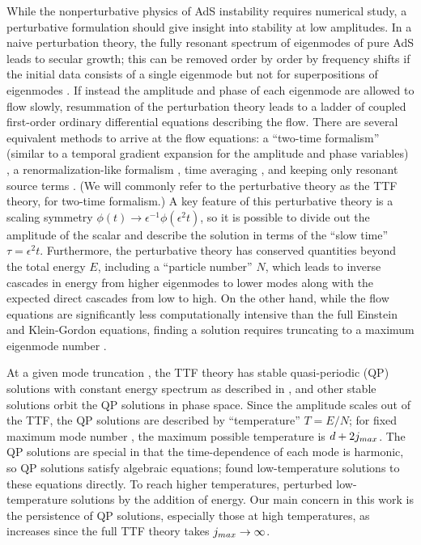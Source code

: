 \documentclass[../PhD.tex]{subfiles}
\begin{document}
While the nonperturbative physics of AdS instability requires numerical study, a perturbative formulation should give insight into stability at low amplitudes.  In a naive perturbation theory, the fully resonant spectrum of eigenmodes of pure AdS leads to secular growth; this can be removed order by order by frequency shifts if the initial data consists of a single eigenmode but not for superpositions of eigenmodes \cite{1109.1825}.  If instead the amplitude and phase of each eigenmode are allowed to flow slowly, resummation of the perturbation theory leads to a ladder of coupled first-order ordinary differential equations describing the flow.  There are several equivalent methods to arrive at the flow equations: a ``two-time formalism'' (similar to a temporal gradient expansion for the amplitude and phase variables) \cite{1403.6471}, a renormalization-like formalism \cite{1407.6273,1412.3249}, time averaging \cite{1412.3249,1510.07836}, and keeping only resonant source terms \cite{1506.03519}.  (We will commonly refer to the perturbative theory as the TTF theory, for two-time formalism.)  A key feature of this perturbative theory is a scaling symmetry $\phi(t)\to \epsilon^{-1}\phi(\epsilon^2 t)$, so it is possible to divide out the amplitude of the scalar and describe the solution in terms of the ``slow time'' $\tau=\epsilon^2 t$.  Furthermore, the perturbative theory has conserved quantities beyond the total energy $E$, including a ``particle number'' $N$, which leads to inverse cascades in energy from higher eigenmodes to lower modes along with the expected direct cascades from low to high.  On the other hand, while the flow equations are significantly less computationally intensive than the full Einstein and Klein-Gordon equations, finding a solution requires truncating to a maximum eigenmode number \jm.

At a given mode truncation \jm, the TTF theory has stable quasi-periodic (QP) solutions with constant energy spectrum as described in \cite{1403.6471,1507.08261}, and other stable solutions orbit the QP solutions in phase space.  Since the amplitude scales out of the TTF, the QP solutions are described by ``temperature'' $T=E/N$; for fixed maximum mode number \jm, the maximum possible temperature is $d+2j_{max}$. The QP solutions are special in that the time-dependence of each mode is harmonic, so QP solutions satisfy algebraic equations; \cite{1507.08261} found low-temperature solutions to these equations directly.  To reach higher temperatures, \cite{1507.08261} perturbed low-temperature solutions by the addition of energy.  Our main concern in this work is the persistence of QP solutions, especially those at high temperatures, as \jm increases since the full TTF theory takes $j_{max}\to\infty$.
\end{document}
